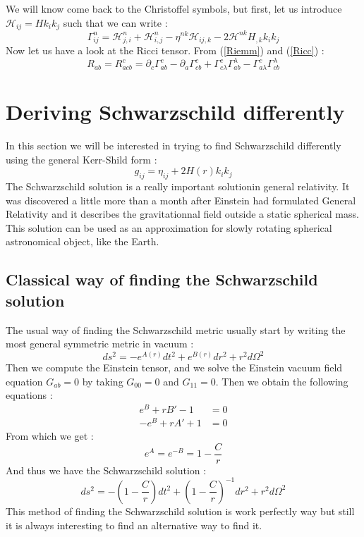 \documentclass[a4paper,12pt]{article}
\theoremstyle{definition}
\begin{document}
We will know come back to the Christoffel symbols, but first, let us introduce $\mathcal{H}_{ij}=Hk_ik_j$ such that we can write :
\begin{equation}
	\Gamma^n_{ij}=\mathcal{H}^n_{j,i}+\mathcal{H}^n_{i,j}-\eta^{nk}\mathcal{H}_{ij,k}-2\mathcal{H}^{nk}H_{,k}k_ik_j
\end{equation}
Now let us have a look at the Ricci tensor. From (\ref{Riemm}) and (\ref{Ricc}) :
\begin{equation}
	R_{ab}=R^c_{acb}=\partial_c\Gamma^c_{ab}-\partial_a\Gamma^c_{cb}+\Gamma^c_{c\lambda}\Gamma^\lambda_{ab}-\Gamma^c_{a\lambda}\Gamma^\lambda_{cb}
\end{equation}

\section{Deriving Schwarzschild differently}
In this section we will be interested in trying to find Schwarzschild differently using the general Kerr-Shild form :
\begin{equation}
	g_{ij}=\eta_{ij}+2H(r)k_ik_j
\end{equation}
The Schwarzschild solution is a really important solutionin general relativity. It was discovered a little more than a month after Einstein had formulated General Relativity and it describes the gravitationnal field outside a static spherical mass.
This solution can be used as an approximation for slowly rotating spherical astronomical object, like the Earth.
\subsection{Classical way of finding the Schwarzschild solution}
The usual way of finding the Schwarzschild metric usually start by writing the most general symmetric metric in vacuum :
\begin{equation}
	ds^2=-e^{A(r)}dt^2+e^{B(r)}dr^2+r^2d\Omega^2
\end{equation}
Then we compute the Einstein tensor, and we solve the Einstein vacuum field equation $G_{ab}=0$ by taking $G_{00}=0$ and $G_{11}=0$. Then we obtain the following equations :
\begin{align}
	e^B+rB'-1&=0\\
	-e^B+rA'+1&=0
\end{align}
From which we get :
\begin{equation}
	e^A=e^{-B}=1-\frac{C}{r}
\end{equation}
And thus we have the Schwarzschild solution :
\begin{equation}
	ds^2=-(1-\frac{C}{r})dt^2+(1-\frac{C}{r})^{-1}dr^2+r^2d\Omega^2
\end{equation}
This method of finding the Schwarzschild solution is work perfectly way but still it is always interesting to find an alternative way to find it.
\end{document}
